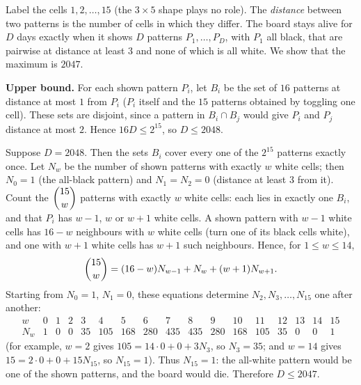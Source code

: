 Label the cells $1,2,\dots,15$ (the $3\times5$ shape plays no role). The \emph{distance} between two patterns is the number of cells in which they differ. The board stays alive for $D$ days exactly when it shows $D$ patterns $P_1,\dots,P_D$, with $P_1$ all black, that are pairwise at distance at least $3$ and none of which is all white. We show that the maximum is $\boxed{2047}$.

\textbf{Upper bound.} For each shown pattern $P_i$, let $B_i$ be the set of $16$ patterns at distance at most $1$ from $P_i$ ($P_i$ itself and the $15$ patterns obtained by toggling one cell). These sets are disjoint, since a pattern in $B_i\cap B_j$ would give $P_i$ and $P_j$ distance at most $2$. Hence $16D\le2^{15}$, so $D\le2048$.

Suppose $D=2048$. Then the sets $B_i$ cover every one of the $2^{15}$ patterns exactly once. Let $N_w$ be the number of shown patterns with exactly $w$ white cells; then $N_0=1$ (the all-black pattern) and $N_1=N_2=0$ (distance at least $3$ from it). Count the $\dbinom{15}{w}$ patterns with exactly $w$ white cells: each lies in exactly one $B_i$, and that $P_i$ has $w-1$, $w$ or $w+1$ white cells. A shown pattern with $w-1$ white cells has $16-w$ neighbours with $w$ white cells (turn one of its black cells white), and one with $w+1$ white cells has $w+1$ such neighbours. Hence, for $1\le w\le14$,
\[\dbinom{15}{w}=(16-w)N_{w-1}+N_w+(w+1)N_{w+1}.\]
Starting from $N_0=1$, $N_1=0$, these equations determine $N_2,N_3,\dots,N_{15}$ one after another:
\[\begin{array}{c|cccccccccccccccc}
w&0&1&2&3&4&5&6&7&8&9&10&11&12&13&14&15\\\hline
N_w&1&0&0&35&105&168&280&435&435&280&168&105&35&0&0&1
\end{array}\]
(for example, $w=2$ gives $105=14\cdot0+0+3N_3$, so $N_3=35$; and $w=14$ gives $15=2\cdot0+0+15N_{15}$, so $N_{15}=1$). Thus $N_{15}=1$: the all-white pattern would be one of the shown patterns, and the board would die. Therefore $D\le2047$.

